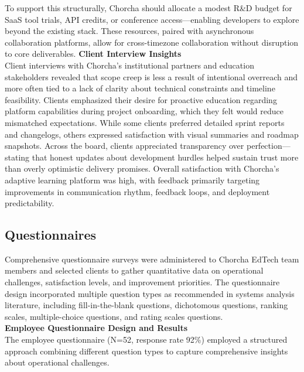 \documentclass[12pt,a4paper,oneside]{book}
\begin{document}
To support this structurally, Chorcha should allocate a modest R\&D budget for SaaS tool trials, API credits, or conference access—enabling developers to explore beyond the existing stack. These resources, paired with asynchronous collaboration platforms, allow for cross-timezone collaboration without disruption to core deliverables.
\newpage
\textbf{Client Interview Insights}\\

Client interviews with Chorcha’s institutional partners and education stakeholders revealed that scope creep is less a result of intentional overreach and more often tied to a lack of clarity about technical constraints and timeline feasibility. Clients emphasized their desire for proactive education regarding platform capabilities during project onboarding, which they felt would reduce mismatched expectations. While some clients preferred detailed sprint reports and changelogs, others expressed satisfaction with visual summaries and roadmap snapshots. Across the board, clients appreciated transparency over perfection—stating that honest updates about development hurdles helped sustain trust more than overly optimistic delivery promises. Overall satisfaction with Chorcha’s adaptive learning platform was high, with feedback primarily targeting improvements in communication rhythm, feedback loops, and deployment predictability.\\

\subsection{Questionnaires}

Comprehensive questionnaire surveys were administered to Chorcha EdTech team members and selected clients to gather quantitative data on operational challenges, satisfaction levels, and improvement priorities. The questionnaire design incorporated multiple question types as recommended in systems analysis literature, including fill-in-the-blank questions, dichotomous questions, ranking scales, multiple-choice questions, and rating scales questions.\\

\textbf{Employee Questionnaire Design and Results}\\

The employee questionnaire (N=52, response rate 92\%) employed a structured approach combining different question types to capture comprehensive insights about operational challenges.\\
\end{document}
